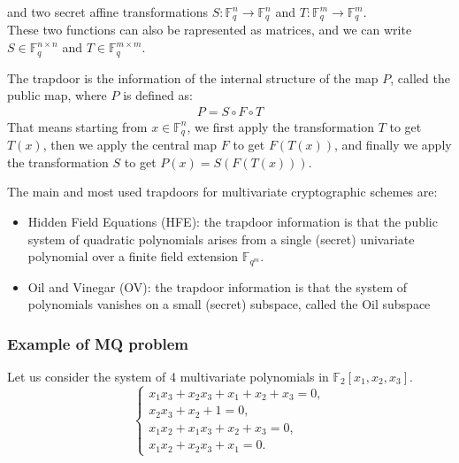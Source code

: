 \noindent
and two secret affine transformations $S: \mathbb{F}_q^n \to \mathbb{F}_q^n$ and $T: \mathbb{F}_q^m \to \mathbb{F}_q^m$.\\
These two functions can also be rapresented as matrices, and we can write $S \in \mathbb{F}_q^{n \times n}$ and $T \in \mathbb{F}_q^{m \times m}$.\\
\bigskip

\noindent
The trapdoor is the information of the internal structure of the map $P$, called the public map, where $P$ is defined as:
\begin{align*}
    P = S \circ F \circ T
\end{align*}
\noindent
That means starting from $x \in \mathbb{F}_q^n$, we first apply the transformation $T$ to get $T(x)$, then we apply the central map $F$ to get $F(T(x))$, and finally we apply the transformation $S$ to get $P(x) = S(F(T(x)))$.\\

\begin{figure}[ht]
\centering
{}
\end{figure}

\noindent
The main and most used trapdoors for multivariate cryptographic schemes are:
\begin{itemize}
    \item Hidden Field Equations (HFE): the trapdoor information is that the public system of
    quadratic polynomials arises from a single (secret) univariate polynomial over a finite field
    extension $\mathbb{F}_{q^m}$.
    \item Oil and Vinegar (OV): the trapdoor information is that the system of polynomials vanishes on a small (secret) subspace, called the Oil subspace
\end{itemize}

\subsubsection*{Example of MQ problem}
Let us consider the system of 4 multivariate polynomials in $\mathbb{F}_2[x_1, x_2, x_3]$.
\begin{equation*}
    \left\{
    \begin{array}{l}
        x_1x_3 + x_2x_3 + x_1 + x_2 + x_3 = 0,\\
        x_2x_3 + x_2 + 1 = 0,\\
        x_1x_2 + x_1x_3 + x_2 + x_3 = 0,\\
        x_1x_2 + x_2x_3 + x_1 = 0.
    \end{array}
    \right.
\end{equation*}

